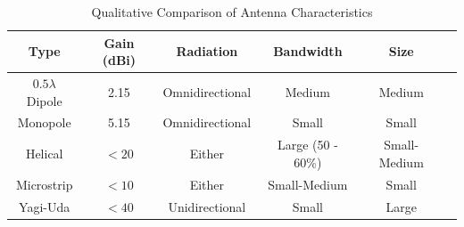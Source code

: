 \begin{table}[!htb]
  \centering
  \renewcommand{\arraystretch}{1.2}
  \begin{tabular}{ |c|c|c|c|c|c| }
  \hline
  \textbf{Type} & \textbf{Gain (dBi)} & \textbf{Radiation} & \textbf{Bandwidth} & \textbf{Size} \\ \hline
  $0.5 \lambda$ Dipole & 2.15 & Omnidirectional & Medium & Medium \\ \hline
  Monopole & 5.15 & Omnidirectional & Small & Small \\ \hline
  Helical & $<20$ & Either & Large (50 - 60\%) & Small-Medium \\ \hline
  Microstrip & $<10$ & Either & Small-Medium & Small \\ \hline
  Yagi-Uda & $<40$ & Unidirectional & Small & Large \\ \hline
  \end{tabular}
  \caption{Qualitative Comparison of Antenna Characteristics \cite{site-antennaTheory}}
  \label{tab:antenna_characteristics}
\end{table}